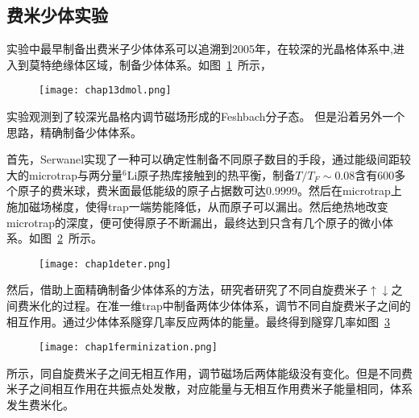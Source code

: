 \subsection{费米少体实验}
实验中最早制备出费米子少体体系可以追溯到2005年，在较深的光晶格体系中,进入到莫特绝缘体区域，制备少体体系\cite{greiner2002quantum,EsslingerFermiSea,Esslinger1DMol,Esslinger3DMol,Ospelkaus3DMol,Hecker3DMol,SalaCIRMol}。如图~\ref{3dmol}~所示，
\begin{figure}[!htbp]
    \centering
    \texttt{[image: chap13dmol.png]}
    \label{3dmol}
\end{figure}
实验观测到了较深光晶格内调节磁场形成的Feshbach分子态。
但是沿着另外一个思路，精确制备少体体系\cite{SerwaneDeterministic,zurn2012fermionization,WenzFermiSeaOnebyOne,Zurn2013Pairing,MurmannSpinChain,MurmannTwoFermionDoubleWell,RontaniTunneling}。

首先，Serwanel实现了一种可以确定性制备不同原子数目的手段，通过能级间距较大的microtrap与两分量${}^6$Li原子热库接触到的热平衡，制备$T/T_F\sim0.08$含有600多个原子的费米球，费米面最低能级的原子占据数可达0.9999。然后在microtrap上施加磁场梯度，使得trap一端势能降低，从而原子可以漏出。然后绝热地改变microtrap的深度，便可使得原子不断漏出，最终达到只含有几个原子的微小体系。如图~\ref{deter}~所示。
\begin{figure}[!htbp]
    \centering
    \texttt{[image: chap1deter.png]}
    \label{deter}
\end{figure}

然后，借助上面精确制备少体体系的方法，研究者研究了不同自旋费米子$\uparrow\downarrow$之间费米化的过程。在准一维trap中制备两体少体体系，调节不同自旋费米子之间的相互作用。通过少体体系隧穿几率反应两体的能量。最终得到隧穿几率如图~\ref{ferminization}~
\begin{figure}[!htbp]
    \centering
    \texttt{[image: chap1ferminization.png]}
    \label{ferminization}
\end{figure}
所示，同自旋费米子之间无相互作用，调节磁场后两体能级没有变化。但是不同费米子之间相互作用在共振点处发散，对应能量与无相互作用费米子能量相同，体系发生费米化。



